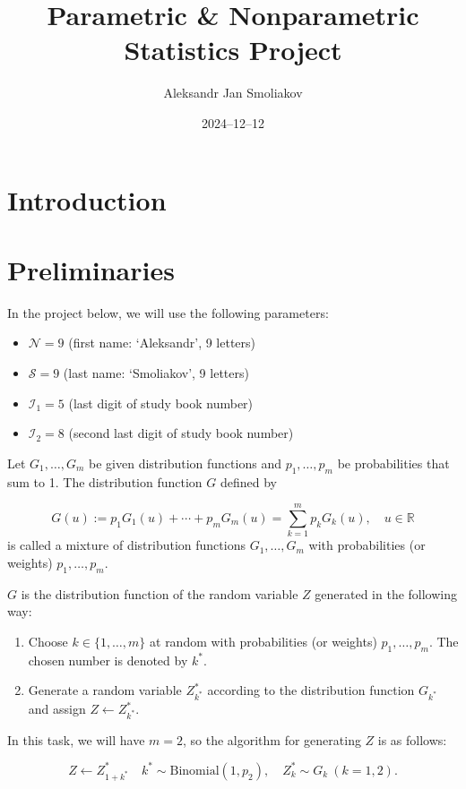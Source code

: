 \documentclass{article}
\title{Parametric \& Nonparametric Statistics Project}
\author{Aleksandr Jan Smoliakov}
\date{2024--12--12}
\begin{document}
\maketitle

\section{Introduction}



\section{Preliminaries}

In the project below, we will use the following parameters:
\begin{itemize}
    \item $\mathcal{N} = 9$ (first name: `Aleksandr', 9 letters)
    \item $\mathcal{S} = 9$ (last name: `Smoliakov', 9 letters)
    \item $\mathcal{I}_1 = 5$ (last digit of study book number)
    \item $\mathcal{I}_2 = 8$ (second last digit of study book number)
\end{itemize}

Let \(G_1, \ldots, G_m\) be given distribution functions and \(p_1, \ldots, p_m\) be probabilities that sum to 1. The distribution function \(G\) defined by

\[
G(u) := p_1 G_1(u) + \cdots + p_m G_m(u) = \sum_{k=1}^m p_k G_k(u), \quad u \in \mathbb{R}
\]
is called a mixture of distribution functions \(G_1, \ldots, G_m\) with probabilities (or weights) \(p_1, \ldots, p_m\).

\(G\) is the distribution function of the random variable \(Z\) generated in the following way:

\begin{enumerate}
    \item Choose \(k \in \{1, \ldots, m\}\) at random with probabilities (or weights) \(p_1, \ldots, p_m\). The chosen number is denoted by \(k^*\).
    \item Generate a random variable \(Z^*_{k^*}\) according to the distribution function \(G_{k^*}\) and assign \(Z \leftarrow Z^*_{k^*}\).
\end{enumerate}

In this task, we will have \(m = 2\), so the algorithm for generating \(Z\) is as follows:

\[
Z \leftarrow Z^*_{1+k^*} \quad k^* \sim \text{Binomial}(1, p_2), \quad Z^*_{k} \sim G_k \ (k = 1, 2).
\]
\end{document}
